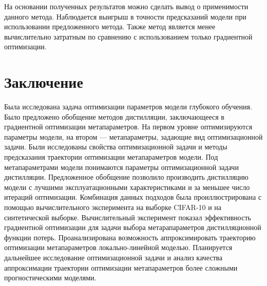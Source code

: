 \documentclass[12pt, twoside]{article}
\begin{document}
На основании полученных результатов можно сделать вывод о применимости данного метода. Наблюдается выигрыш в точности предсказаний модели при использовании предложенного метода. Также метод является менее вычислительно затратным по сравнению с использованием только градиентной оптимизации.



\section{Заключение}

Была исследована задача оптимизации параметров модели глубокого обучения. Было предложено обобщение методов дистилляции, заключающееся в градиентной оптимизации метапараметров. На первом уровне оптимизируются параметры модели, на втором --- метапараметры, задающие вид оптимизационной задачи. Были исследованы свойства оптимизационной задачи и методы предсказания траектории оптимизации метапараметров модели. Под метапараметрами модели понимаются параметры оптимизационной задачи дистилляции. Предложенное обобщение позволило производить дистилляцию модели с лучшими эксплуатационными характеристиками и за меньшее число итераций оптимизации. Комбинация данных подходов была проиллюстрирована с помощью вычислительного эксперимента на выборке CIFAR-10 и на синтетической выборке. Вычислительный эксперимент показал эффективность градиентной оптимизации для задачи выбора метарапараметров дистилляционной функции потерь. Проанализирована возможность аппроксимировать траекторию оптимизации метапараметров локально-линейной моделью. Планируется дальнейшее исследование оптимизационной задачи и анализ качества аппроксимации траектории оптимизации метапараметров более сложными прогностическими моделями.







\maketitleSecondary
\English



\end{document}
